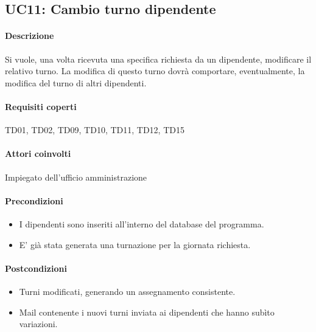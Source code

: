 \subsection{UC11: Cambio turno dipendente}
\paragraph{Descrizione}
Si vuole, una volta ricevuta una specifica richiesta da un dipendente, modificare il relativo turno. La modifica di questo turno dovrà comportare, eventualmente, la modifica del turno di altri dipendenti.
\paragraph{Requisiti coperti}
TD01, TD02, TD09, TD10, TD11, TD12, TD15
\paragraph{Attori coinvolti}
Impiegato dell'ufficio amministrazione
\paragraph{Precondizioni}
\begin{itemize}
	\item I dipendenti sono inseriti all'interno del database del programma.
	\item E' già stata generata una turnazione per la giornata richiesta.
\end{itemize}
\paragraph{Postcondizioni}
\begin{itemize}
	\item Turni modificati, generando un assegnamento consistente.
	\item Mail contenente i nuovi turni inviata ai dipendenti che hanno subìto variazioni.
\end{itemize}
